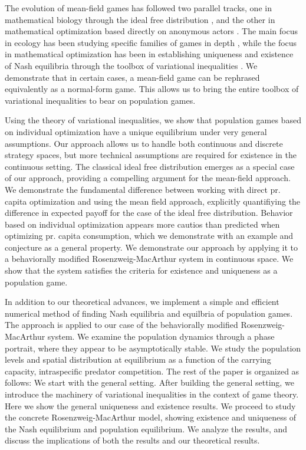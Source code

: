 The evolution of mean-field games has followed two parallel tracks, one in mathematical biology through the ideal free distribution \citep{fretwell1969territorial, cressman2004ideal, kvrivan2008ideal, cressman2010ideal, broom2013game, parker1978searching}, and the other in mathematical optimization based directly on anonymous actors \citep{lasry2007mean, aumann1964markets, blanchet2016optimal}. The main focus in ecology has been studying specific families of games in depth \cite{broom2013game}, while the focus in mathematical optimization has been in establishing uniqueness and existence of Nash equilibria through the toolbox of variational inequalities \citep{karamardian1969nonlinear, gabay1980uniqueness, nabetani2011parametrized}. We demonstrate that in certain cases, a mean-field game can be rephrased equivalently as a normal-form game. This allows us to bring the entire toolbox of variational inequalities to bear on population games.


Using the theory of variational inequalities, we show that population games based on individual optimization have a unique equilibrium under very general assumptions. Our approach allows us to handle both continuous and discrete strategy spaces, but more technical assumptions are required for existence in the continuous setting. The classical ideal free distribution emerges as a special case of our approach, providing a compelling argument for the mean-field approach. We demonstrate the fundamental difference between working with direct pr. capita optimization and using the mean field approach, explicitly quantifiying the difference in expected payoff for the case of the ideal free distribution. Behavior based on individual optimization appears more cautios than predicted when optimizing pr. capita consumption, which we demonstrate with an example and conjecture as a general property. We demonstrate our approach by applying it to a behaviorally modified Rosenzweig-MacArthur system in continuous space. We show that the system satisfies the criteria for existence and uniqueness as a population game.


In addition to our theoretical advances, we implement a simple and efficient numerical method of finding Nash equilibria and equilbria of population games. The approach is applied to our case of the behaviorally modified Rosenzweig-MacArthur system. We examine the population dynamics through a phase portrait, where they appear to be asymptotically stable. We study the population levels and spatial distribution at equilibrium as a function of the carrying capacity, intraspecific predator competition. The rest of the paper is organized as follows: We start with the general setting. After building the general setting, we introduce the machinery of variational inequalities in the context of game theory. Here we show the general uniqueness and existence results. We proceed to study the concrete Rosenzweig-MacArthur model, showing existence and uniqueness of the Nash equilibrium and population equilibrium. We analyze the results, and discuss the implications of both the results and our theoretical results.

